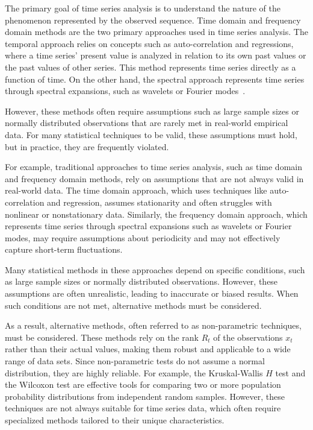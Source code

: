 The primary goal of time series analysis is to understand the nature of the phenomenon represented by the observed sequence. Time domain and frequency domain methods are the two primary approaches used in time series analysis. The temporal approach relies on concepts such as auto-correlation and regressions, where a time series' present value is analyzed in relation to its own past values or the past values of other series. This method represents time series directly as a function of time. On the other hand, the spectral approach represents time series through spectral expansions, such as wavelets or Fourier modes~\cite{treitel1995spectral}.

 
However, these methods often require assumptions such as large sample sizes or normally distributed observations that are rarely met in real-world empirical data. For many statistical techniques to be valid, these assumptions must hold, but in practice, they are frequently violated.

For example, traditional approaches to time series analysis, such as time domain and frequency domain methods, rely on assumptions that are not always valid in real-world data. The time domain approach, which uses techniques like auto-correlation and regression, assumes stationarity and often struggles with nonlinear or nonstationary data. Similarly, the frequency domain approach, which represents time series through spectral expansions such as wavelets or Fourier modes, may require assumptions about periodicity and may not effectively capture short-term fluctuations.

Many statistical methods in these approaches depend on specific conditions, such as large sample sizes or normally distributed observations. However, these assumptions are often unrealistic, leading to inaccurate or biased results. When such conditions are not met, alternative methods must be considered.

As a result, alternative methods, often referred to as non-parametric techniques, must be considered. 
These methods rely on the rank $R_t$ of the observations $x_t$ rather than their actual values, making them robust and applicable to a wide range of data sets. Since non-parametric tests do not assume a normal distribution, they are highly reliable. For example, the Kruskal-Wallis $H$ test and the Wilcoxon test are effective tools for comparing two or more population probability distributions from independent random samples. However, these techniques are not always suitable for time series data, which often require specialized methods tailored to their unique characteristics.

